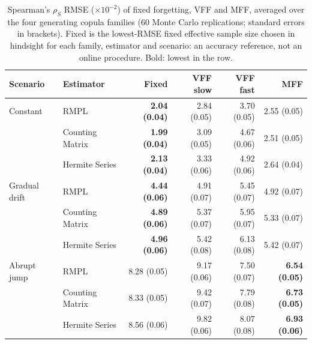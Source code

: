 \begin{table}[htbp]
\centering
\caption{Spearman's $\rho_S$ RMSE ($\times10^{-2}$) of fixed forgetting, VFF and MFF, averaged over the four generating copula families (60 Monte Carlo replications; standard errors in brackets). Fixed is the lowest-RMSE fixed effective sample size chosen in hindsight for each family, estimator and scenario: an accuracy reference, not an online procedure. Bold: lowest in the row.}
\label{tab:strategy-rmse}
\begin{tabular}{llrrrr}
\toprule
Scenario & Estimator & Fixed & VFF slow & VFF fast & MFF \\
\midrule
Constant & RMPL & \textbf{2.04 (0.04)} & 2.84 (0.05) & 3.70 (0.05) & 2.55 (0.05) \\
 & Counting Matrix & \textbf{1.99 (0.04)} & 3.09 (0.05) & 4.67 (0.06) & 2.51 (0.05) \\
 & Hermite Series & \textbf{2.13 (0.04)} & 3.33 (0.06) & 4.92 (0.06) & 2.64 (0.04) \\
\addlinespace
Gradual drift & RMPL & \textbf{4.44 (0.06)} & 4.91 (0.07) & 5.45 (0.07) & 4.92 (0.07) \\
 & Counting Matrix & \textbf{4.89 (0.06)} & 5.37 (0.07) & 5.95 (0.07) & 5.33 (0.07) \\
 & Hermite Series & \textbf{4.96 (0.06)} & 5.42 (0.08) & 6.13 (0.08) & 5.42 (0.07) \\
\addlinespace
Abrupt jump & RMPL & 8.28 (0.05) & 9.17 (0.06) & 7.50 (0.07) & \textbf{6.54 (0.05)} \\
 & Counting Matrix & 8.33 (0.05) & 9.42 (0.07) & 7.79 (0.08) & \textbf{6.73 (0.05)} \\
 & Hermite Series & 8.56 (0.06) & 9.82 (0.06) & 8.07 (0.08) & \textbf{6.93 (0.06)} \\
\bottomrule
\end{tabular}
\end{table}

